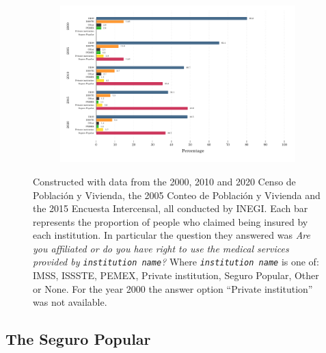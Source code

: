 \documentclass[oneside,11pt]{article}
\begin{document}
\begin{figure}[H]
     \caption{Insurance affiliation 2000-2020}
    \label{insurance_aff}
\begin{center}
    \begin{subfigure}{\textwidth}
        \includegraphics[width=\textwidth]{Figuras/derechohabiencia.pdf}
    \end{subfigure}
  \end{center}
  \scriptsize 
    Constructed with data from the 2000, 2010 and 2020 Censo de Población y Vivienda, the 2005 Conteo de Población y Vivienda and the 2015 Encuesta Intercensal, all conducted by INEGI. Each bar represents the proportion of people who claimed being insured by each institution. In particular the question they answered was \textit{Are you affiliated or do you have right to use the medical services provided by \texttt{institution name}?} Where \textit{\texttt{institution name}} is one of: IMSS, ISSSTE, PEMEX, Private institution, Seguro Popular, Other or None. For the year 2000 the answer option ``Private institution'' was not available.
\end{figure}



\subsection{The Seguro Popular}
\end{document}
